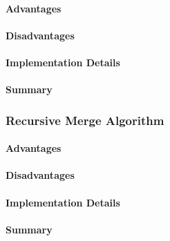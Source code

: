 \paragraph{Advantages}
\paragraph{Disadvantages}

\paragraph{Implementation Details}

\paragraph{Summary}


\subsubsection{Recursive Merge Algorithm}

\paragraph{Advantages}
\paragraph{Disadvantages}

\paragraph{Implementation Details}

\paragraph{Summary}

